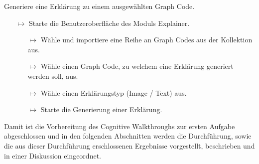 \begin{tcolorbox}[minipage, colback=white, colframe=black, arc=0pt, outer arc=0pt]
  Generiere eine Erklärung zu einem ausgewählten Graph Code.
  \begin{itemize}
    \item[$\mapsto$] Starte die Benutzeroberfläche des Moduls Explainer.
    \begin{itemize}
      \item[$\mapsto$] Wähle und importiere eine Reihe an Graph Codes aus der Kollektion aus.
      \item[$\mapsto$] Wähle einen Graph Code, zu welchem eine Erklärung generiert werden soll, aus.
      \item[$\mapsto$] Wähle einen Erklärungstyp (Image / Text) aus.
      \item[$\mapsto$] Starte die Generierung einer Erklärung.
    \end{itemize}
  \end{itemize}
\end{tcolorbox}

Damit ist die Vorbereitung des Cognitive Walkthroughs zur ersten Aufgabe abgeschlossen und in den folgenden Abschnitten werden die Durchführung, sowie die aus dieser Durchführung erschlossenen Ergebnisse vorgestellt, beschrieben und in einer Diskussion eingeordnet.


